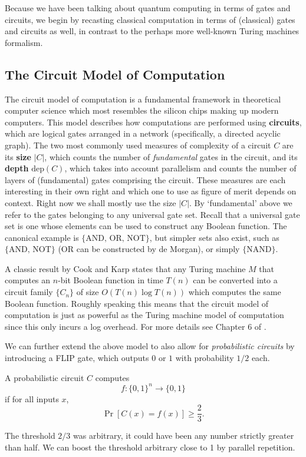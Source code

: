 Because we have been talking about quantum computing in terms of gates and circuits, we begin by recasting classical computation in terms of (classical) gates and circuits as well, in contrast to the perhaps more well-known Turing machines formalism. 

\subsection{The Circuit Model of Computation}

The circuit model of computation is a fundamental framework in theoretical computer science which most resembles the silicon chips making up modern computers. This model describes how computations are performed using \textbf{circuits}, which are logical gates arranged in a network (specifically, a directed acyclic graph). The two most commonly used measures of complexity of a circuit $C$ are its \textbf{size} $|C|$, which counts the number of \textit{fundamental} gates in the circuit, and its \textbf{depth} $\text{dep}(C)$, which takes into account parallelism and counts the number of layers of (fundamental) gates comprising the circuit. These measures are each interesting in their own right and which one to use as figure of merit depends on context. Right now we shall mostly use the size $|C|$. By `fundamental' above we refer to the gates belonging to any universal gate set. Recall that a universal gate set is one whose elements can be used to construct any Boolean function. The canonical example is $\{\text{AND, OR, NOT}\}$, but simpler sets also exist, such as $\{\text{AND, NOT}\}$ (OR can be constructed by de Morgan), or simply $\{\text{NAND}\}$.

A classic result by Cook and Karp states that any Turing machine $M$ that computes an $n$-bit Boolean function in time $T(n)$ can be converted into a circuit family $\{C_n\}$ of size $O(T(n) \log T(n))$ which computes the same Boolean function. Roughly speaking this means that the circuit model of computation is just as powerful as the Turing machine model of computation since this only incurs a log overhead. For more details see Chapter 6 of \cite{arora2009computational}.

We can further extend the above model to also allow for \emph{probabilistic circuits} by introducing a FLIP gate, which outputs $0$ or $1$ with probability $1/2$ each.
\begin{definition}
A probabilistic circuit $C$ computes 
\[
f : \{0,1\}^n \rightarrow \{0,1\}
\]
if for all inputs $x$,
\[
\Pr[C(x) = f(x)] \geq \frac{2}{3}.
\]
\end{definition}
The threshold $2/3$ was arbitrary, it could have been any number strictly greater than half. We can boost the threshold arbitrary close to 1 by parallel repetition.

